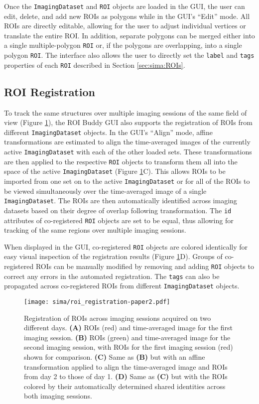 Once the \verb|ImagingDataset| and \verb|ROI| objects are loaded in the GUI,
the user can edit, delete, and add new ROIs as polygons while in the GUI's ``Edit'' mode.
All ROIs are directly editable, allowing for the user to adjust individual vertices or translate the entire ROI.
In addition, separate polygons can be merged either into a single
multiple-polygon \verb|ROI| or, if the polygons are overlapping, into a single polygon \verb|ROI|.
The interface also allows the user to directly set the \verb|label| and \verb|tags|
properties of each \verb|ROI| described in Section \ref{sec:sima:ROIs}.


\subsection{ROI Registration}
To track the same structures over multiple imaging sessions of the same field of view (Figure \ref{fig:sima:registration}),
the ROI Buddy GUI also supports the registration of ROIs from different \verb|ImagingDataset| objects.
In the GUI's ``Align'' mode, affine transformations are estimated to align the time-averaged images
of the currently active \verb|ImagingDataset| with each of the other loaded sets.
These transformations are then applied to the respective \verb|ROI| objects to transform them all into the space of the active \verb|ImagingDataset| (Figure \ref{fig:sima:registration}C).
This allows ROIs to be imported from one set on to the active \verb|ImagingDataset| or for
all of the ROIs to be viewed simultaneously over the time-averaged image of a single \verb|ImagingDataset|.
The ROIs are then automatically identified across imaging datasets based on their degree of overlap
following transformation.  The \verb|id| attributes of co-registered \verb|ROI| objects are set to be equal,
thus allowing for tracking of the same regions over multiple imaging sessions.

When displayed in the GUI, 
co-registered \verb|ROI| objects are colored identically for easy visual 
inspection of the registration results (Figure \ref{fig:sima:registration}D).
Groups of co-registered ROIs can be manually modified by removing and adding \verb|ROI| objects
to correct any errors in the automated registration.
The \verb|tags| can also be propagated across co-registered ROIs from different \verb|ImagingDataset| objects.

\begin{figure}[]
	\centering
	\texttt{[image: sima/roi\_registration-paper2.pdf]}
	\caption[Registration of ROIs across imaging sessions acquired on two different days]{Registration of ROIs across imaging sessions acquired on two different days.
	\textbf{(A)} ROIs (red) and time-averaged image for the first imaging session.
	\textbf{(B)} ROIs (green) and time-averaged image for the second imaging session, with ROIs for the first imaging session (red) shown for comparison.
	\textbf{(C)} Same as \textbf{(B)} but with an affine transformation applied to align the time-averaged image and ROIs from day 2 to those of day 1.
	\textbf{(D)} Same as \textbf{(C)} but with the ROIs colored by their automatically determined shared identities across both imaging sessions.}
	\label{fig:sima:registration}
\end{figure}

